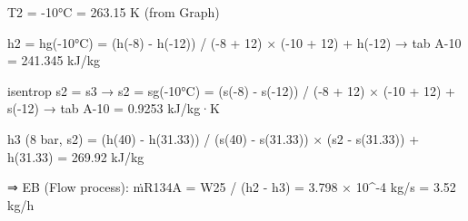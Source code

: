 T2 = -10°C = 263.15 K  
(from Graph)  

h2 = hg(-10°C) = (h(-8) - h(-12)) / (-8 + 12) × (-10 + 12) + h(-12)  
→ tab A-10  
= 241.345 kJ/kg  

isentrop  
s2 = s3  
→ s2 = sg(-10°C) = (s(-8) - s(-12)) / (-8 + 12) × (-10 + 12) + s(-12)  
→ tab A-10  
= 0.9253 kJ/kg·K  

h3 (8 bar, s2) = (h(40) - h(31.33)) / (s(40) - s(31.33)) × (s2 - s(31.33)) + h(31.33)  
= 269.92 kJ/kg  

⇒ EB (Flow process):  
ṁR134A = W25 / (h2 - h3) = 3.798 × 10^-4 kg/s = 3.52 kg/h